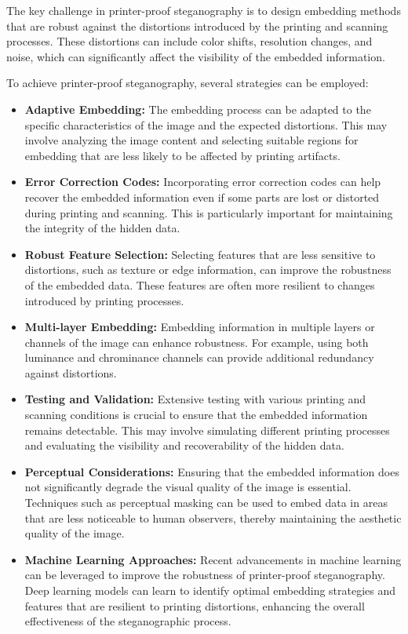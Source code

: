 The key challenge in printer-proof steganography is to design embedding methods that are robust against the distortions introduced by the printing and scanning processes. These distortions can include color shifts, resolution changes, and noise, which can significantly affect the visibility of the embedded information.

To achieve printer-proof steganography, several strategies can be employed:
\begin{itemize}
    \item \textbf{Adaptive Embedding:} The embedding process can be adapted to the specific characteristics of the image and the expected distortions. This may involve analyzing the image content and selecting suitable regions for embedding that are less likely to be affected by printing artifacts.
    \item \textbf{Error Correction Codes:} Incorporating error correction codes can help recover the embedded information even if some parts are lost or distorted during printing and scanning. This is particularly important for maintaining the integrity of the hidden data.
    \item \textbf{Robust Feature Selection:} Selecting features that are less sensitive to distortions, such as texture or edge information, can improve the robustness of the embedded data. These features are often more resilient to changes introduced by printing processes.
    \item \textbf{Multi-layer Embedding:} Embedding information in multiple layers or channels of the image can enhance robustness. For example, using both luminance and chrominance channels can provide additional redundancy against distortions.
    \item \textbf{Testing and Validation:} Extensive testing with various printing and scanning conditions is crucial to ensure that the embedded information remains detectable. This may involve simulating different printing processes and evaluating the visibility and recoverability of the hidden data.
    \item \textbf{Perceptual Considerations:} Ensuring that the embedded information does not significantly degrade the visual quality of the image is essential. Techniques such as perceptual masking can be used to embed data in areas that are less noticeable to human observers, thereby maintaining the aesthetic quality of the image.
    \item \textbf{Machine Learning Approaches:} Recent advancements in machine learning can be leveraged to improve the robustness of printer-proof steganography. Deep learning models can learn to identify optimal embedding strategies and features that are resilient to printing distortions, enhancing the overall effectiveness of the steganographic process.

\end{itemize}
